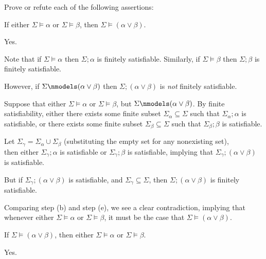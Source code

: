 

\begin{problem}
  Prove or refute each of the following assertions:
  \begin{enumalph}
    \item If either $\Sigma \models \alpha$ or $\Sigma \models \beta$,
      then $\Sigma \models (\alpha \lor \beta)$.
      \begin{Answer}
        Yes.
        \\
        
        \begin{enumroman}
          \item Note that if $\Sigma \models \alpha$ then $\Sigma ; \alpha$ is finitely satisfiable.
            Similarly, if $\Sigma \models \beta$ then $\Sigma ; \beta$ is finitely satisfiable.~\label{cor:5.1}
          \item However, if $\Sigma \nmodels (\alpha \lor \beta)$
            then $\Sigma ; (\alpha \lor \beta)$ is \emph{not} finitely satisfiable.~\label{cor:5.2}
          \item Suppose that either $\Sigma \models \alpha$ or $\Sigma \models \beta$,
            but $\Sigma \nmodels (\alpha \lor \beta)$.
            By finite satisfiability,
            either there exists some finite subset
            $\Sigma_\alpha \subseteq \Sigma$ such that $\Sigma_\alpha ; \alpha$ is satisfiable,
            or there exists some finite subset $\Sigma_\beta \subseteq \Sigma$
            such that $\Sigma_\beta ; \beta$ is satisfiable.
          \item Let $\Sigma_\gamma = \Sigma_\alpha \cup \Sigma_\beta$
            (substituting the empty set for any nonexisting set),\\
            then either $\Sigma_\gamma ; \alpha$ is satisfiable or $\Sigma_\gamma ; \beta$ is satisfiable,
            implying that $\Sigma_\gamma ; (\alpha \lor \beta)$ is satisfiable.
          \item But if $\Sigma_\gamma ; (\alpha \lor \beta)$ is satisfiable,
            and $\Sigma_\gamma \subseteq \Sigma$, then $\Sigma ; (\alpha \lor \beta)$ is finitely satisfiable.~\label{cor:5.3}
          \item Comparing step (b) and step (e), we see a clear contradiction,
            implying that whenever either $\Sigma \models \alpha$ or $\Sigma \models \beta$,
            it must be the case that $\Sigma \models (\alpha \lor \beta)$.
        \end{enumroman}
      \end{Answer}
    \item If $\Sigma \models (\alpha \lor \beta)$, then either $\Sigma \models \alpha$
      or $\Sigma \models \beta$.
      \begin{Answer}
        Yes.
        \\
        

\end{Answer}
\end{enumalph}
\end{problem}
